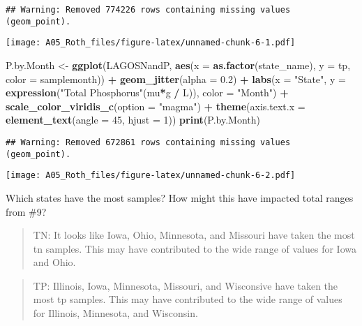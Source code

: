 \documentclass[]{article}
\newenvironment{Shaded}{\begin{snugshade}}{\end{snugshade}}
\newcommand{\DataTypeTok}[1]{\textcolor[rgb]{0.13,0.29,0.53}{#1}}
\newcommand{\DecValTok}[1]{\textcolor[rgb]{0.00,0.00,0.81}{#1}}
\newcommand{\FloatTok}[1]{\textcolor[rgb]{0.00,0.00,0.81}{#1}}
\newcommand{\KeywordTok}[1]{\textcolor[rgb]{0.13,0.29,0.53}{\textbf{#1}}}
\newcommand{\NormalTok}[1]{#1}
\newcommand{\OperatorTok}[1]{\textcolor[rgb]{0.81,0.36,0.00}{\textbf{#1}}}
\newcommand{\StringTok}[1]{\textcolor[rgb]{0.31,0.60,0.02}{#1}}
\begin{document}
\begin{verbatim}
## Warning: Removed 774226 rows containing missing values (geom_point).
\end{verbatim}

\texttt{[image: A05\_Roth\_files/figure-latex/unnamed-chunk-6-1.pdf]}

\begin{Shaded}
\begin{Highlighting}[]
\NormalTok{P.by.Month <-}\StringTok{  }
\KeywordTok{ggplot}\NormalTok{(LAGOSNandP, }
       \KeywordTok{aes}\NormalTok{(}\DataTypeTok{x =} \KeywordTok{as.factor}\NormalTok{(state_name), }\DataTypeTok{y =}\NormalTok{ tp, }\DataTypeTok{color =}\NormalTok{ samplemonth)) }\OperatorTok{+}
\StringTok{  }\KeywordTok{geom_jitter}\NormalTok{(}\DataTypeTok{alpha =} \FloatTok{0.2}\NormalTok{) }\OperatorTok{+}\StringTok{ }
\StringTok{  }\KeywordTok{labs}\NormalTok{(}\DataTypeTok{x =} \StringTok{"State"}\NormalTok{, }\DataTypeTok{y =} \KeywordTok{expression}\NormalTok{(}\StringTok{"Total Phosphorus"}\NormalTok{(mu}\OperatorTok{*}\NormalTok{g }\OperatorTok{/}\StringTok{ }\NormalTok{L)), }\DataTypeTok{color =} \StringTok{"Month"}\NormalTok{) }\OperatorTok{+}
\StringTok{  }\KeywordTok{scale_color_viridis_c}\NormalTok{(}\DataTypeTok{option =} \StringTok{"magma"}\NormalTok{) }\OperatorTok{+}
\StringTok{  }\KeywordTok{theme}\NormalTok{(}\DataTypeTok{axis.text.x =} \KeywordTok{element_text}\NormalTok{(}\DataTypeTok{angle =} \DecValTok{45}\NormalTok{, }\DataTypeTok{hjust =} \DecValTok{1}\NormalTok{))}
\KeywordTok{print}\NormalTok{(P.by.Month)}
\end{Highlighting}
\end{Shaded}

\begin{verbatim}
## Warning: Removed 672861 rows containing missing values (geom_point).
\end{verbatim}

\texttt{[image: A05\_Roth\_files/figure-latex/unnamed-chunk-6-2.pdf]}

Which states have the most samples? How might this have impacted total
ranges from \#9?

\begin{quote}
TN: It looks like Iowa, Ohio, Minnesota, and Missouri have taken the
most tn samples. This may have contributed to the wide range of values
for Iowa and Ohio.
\end{quote}

\begin{quote}
TP: Illinois, Iowa, Minnesota, Missouri, and Wisconsive have taken the
most tp samples. This may have contributed to the wide range of values
for Illinois, Minnesota, and Wisconsin.
\end{quote}
\end{document}
